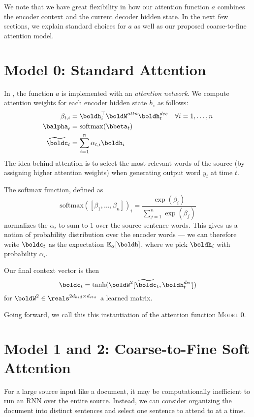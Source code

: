 \documentclass[11pt]{report}
\begin{document}
We note that we have great flexibility in how our attention function $a$ combines the encoder context and the current decoder hidden state. In the next few sections, we explain standard choices for $a$ as well as our proposed coarse-to-fine attention model.

\section{Model 0: Standard Attention}

In \cite{bahdanau2014neural}, the function $a$ is implemented with an \emph{attention network}. We compute attention weights for each encoder hidden state $h_i$ as follows:
\begin{align}
\beta_{t,i} &= \boldh_i^\top \boldW^{attn} \boldh_t^{dec} \quad \forall i = 1, \ldots, n\\
\balpha_t &= \mathrm{softmax}(\bbeta_t) \\
\widetilde{\boldc}_t &= \sum_{i=1}^n \alpha_{t,i} \boldh_i
\end{align}
The idea behind attention is to select the most relevant words of the source (by assigning higher attention weights) when generating output word $y_t$ at time $t$.

The $\mathrm{softmax}$ function, defined as
$$\mathrm{softmax}([\beta_1, \ldots, \beta_n])_i =  \frac{\exp(\beta_i)}{\sum_{j=1}^n \exp(\beta_j)}$$
normalizes the $\alpha_i$ to sum to 1 over the source sentence words. This gives us a notion of probability distribution over the encoder words --- we can therefore write $\boldc_t$ as the expectation $\mathbb{E}_\alpha[\boldh]$, where we pick $\boldh_i$ with probability $\alpha_i$.

Our final context vector is then
\begin{equation}
\boldc_t = \tanh(\boldW^2[\widetilde{\boldc}_t, \boldh_t^{dec}])
\end{equation}
for $\boldW^2 \in \reals^{2d_{hid} \times d_{ctx}}$ a learned matrix.

Going forward, we call this this instantiation of the attention function \textsc{Model 0}.


\section{Model 1 and 2: Coarse-to-Fine Soft Attention}

For a large source input like a document, it may be computationally inefficient to run an RNN over the entire source. Instead, we can consider organizing the document into distinct sentences and select one sentence to attend to at a time.
\end{document}
